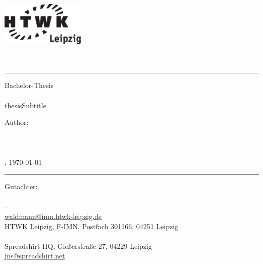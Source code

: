 
\begin{center}
    \includegraphics[width=4cm]{frontpage/HTWK_Logo_schwarz}\\
    \vspace{12pt}
    \large
        \textbf{\thesisUniversity}\\
    \vspace{6pt}
    \normalsize
        \thesisUniversityDepartment\\

    \vspace{24pt}
    \rule{\textwidth}{0.5pt}
    \vspace{12pt}

    \Huge
        Bachelor-Thesis\\
    \vspace{12pt}
    \Large
        \textbf{\thesisTitle}\\
        \ifcsname thesisSubtitle \endcsname
            \large
            \thesisSubtitle
        \else
        \fi
    \vspace{24pt}

    \small
        Author:\\
    \vspace{6pt}
    \large
        \textbf{\thesisAuthor}\\
        \vspace{3pt}
        \normalsize
        \thesisAuthorClass\\
        \href{mailto:\thesisAuthorEmail}{\thesisAuthorEmail}\\
        \thesisAuthorCity, \today\\        

    \vspace{24pt}
    \rule{\textwidth}{0.5pt}
    \vspace{12pt}

    \vfill
    \small
        Gutachter:\\
    \vspace{6pt}
    \large
        \thesisAdvisor\\
    \small
        \thesisUniversity{} -- \thesisUniversityDepartment\\
        \href{mailto:waldmann@imn.htwk-leipzig.de}{waldmann@imn.htwk-leipzig.de}\\
        HTWK Leipzig, F-IMN, Postfach 301166, 04251 Leipzig\\

    \vspace{6pt}
    \large
        \thesisAdvisorSprd\\
    \small
        Spreadshirt HQ, Gießerstraße 27, 04229 Leipzig\\
        \href{mailto:jns@spreadshirt.net}{jns@spreadshirt.net}\\
\end{center}

